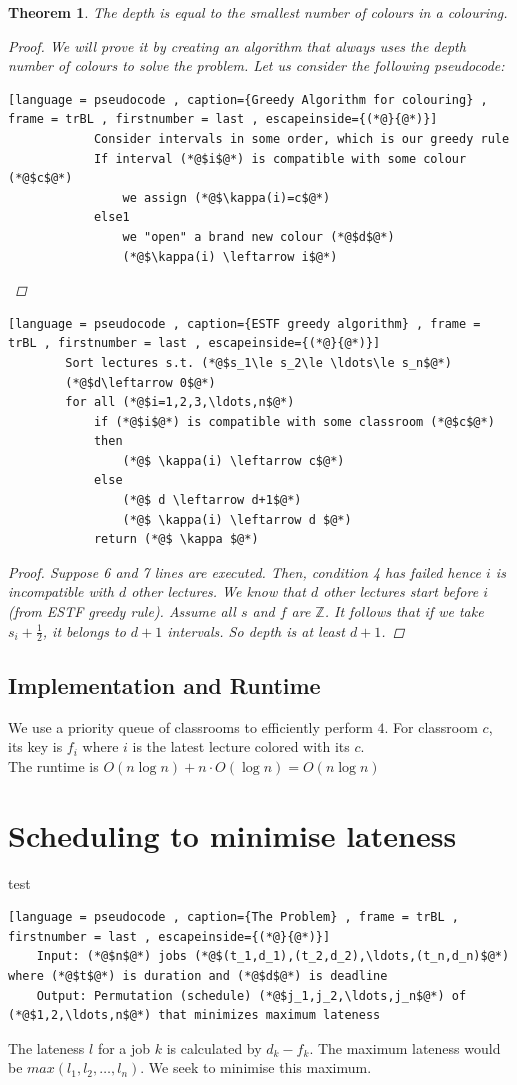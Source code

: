\documentclass[a4paper]{article}
\theoremstyle{plain}
\newtheorem{thm}{Theorem}[section]
\theoremstyle{definition}
\theoremstyle{remark}
\begin{document}
	\begin{thm}
		The depth is equal to the smallest number of colours in a colouring.
		\begin{proof} We will prove it by creating an algorithm that always uses the depth number of colours to solve the problem. Let us consider the following pseudocode:
			\begin{lstlisting}[language = pseudocode , caption={Greedy Algorithm for colouring} , frame = trBL , firstnumber = last , escapeinside={(*@}{@*)}]
			Consider intervals in some order, which is our greedy rule
			If interval (*@$i$@*) is compatible with some colour (*@$c$@*)
				we assign (*@$\kappa(i)=c$@*)
			else1
				we "open" a brand new colour (*@$d$@*)
				(*@$\kappa(i) \leftarrow i$@*)
			\end{lstlisting}
		\end{proof}
		\begin{lstlisting}[language = pseudocode , caption={ESTF greedy algorithm} , frame = trBL , firstnumber = last , escapeinside={(*@}{@*)}]
		Sort lectures s.t. (*@$s_1\le s_2\le \ldots\le s_n$@*)
		(*@$d\leftarrow 0$@*)
		for all (*@$i=1,2,3,\ldots,n$@*)
			if (*@$i$@*) is compatible with some classroom (*@$c$@*)
			then
				(*@$ \kappa(i) \leftarrow c$@*)
			else
				(*@$ d \leftarrow d+1$@*)
				(*@$ \kappa(i) \leftarrow d $@*)
			return (*@$ \kappa $@*)
		\end{lstlisting}
		\begin{proof}
			Suppose 6 and 7 lines are executed. Then, condition 4 has failed hence $i$ is incompatible with $d$ other lectures. We know that $d$ other lectures start before $i$ (from ESTF greedy rule). Assume all $s$ and $f$ are $\mathbb{Z}$. It follows that if we take $s_i+\frac{1}{2}$, it belongs to $d+1$ intervals. So depth is at least $d+1$. 
		\end{proof}
	\end{thm}
	\subsection{Implementation and Runtime}
	We use a priority queue of classrooms to efficiently perform $4$. For classroom $c$, its key is $f_i$ where $i$ is the latest lecture colored with its $c$.  \\
	The runtime is $O(n \log n) + n \cdot O(\log n)  = O(n \log n)$ 
	\section{Scheduling to minimise lateness}
	test
	\begin{lstlisting}[language = pseudocode , caption={The Problem} , frame = trBL , firstnumber = last , escapeinside={(*@}{@*)}]
	Input: (*@$n$@*) jobs (*@$(t_1,d_1),(t_2,d_2),\ldots,(t_n,d_n)$@*) where (*@$t$@*) is duration and (*@$d$@*) is deadline
	Output: Permutation (schedule) (*@$j_1,j_2,\ldots,j_n$@*) of (*@$1,2,\ldots,n$@*) that minimizes maximum lateness
	\end{lstlisting}
	The lateness $l$ for a job $k$ is calculated by $d_k - f_k$. The maximum lateness would be $max(l_1,l_2,\ldots,l_n)$. We seek to minimise this maximum.
\end{document}
